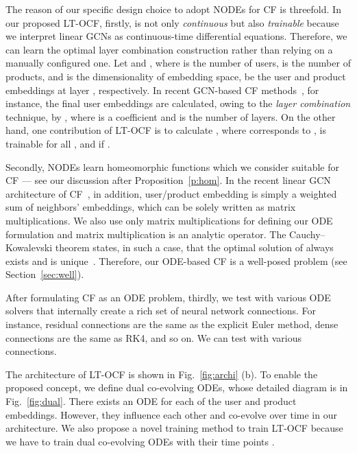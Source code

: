 \documentclass[sigconf]{acmart}
\begin{document}
The reason of our specific design choice to adopt NODEs for CF is threefold. In our proposed LT-OCF, firstly,  is not only \emph{continuous} but also \emph{trainable} because we interpret linear GCNs as continuous-time differential equations. Therefore, we can learn the optimal layer combination construction rather than relying on a manually configured one. Let  and , where  is the number of users,  is the number of products, and  is the dimensionality of embedding space, be the user and product embeddings at layer , respectively. In recent GCN-based CF methods~\cite{Chen_Wu_Hong_Zhang_Wang_2020,10.1145/3397271.3401063}, for instance, the final user embeddings are calculated, owing to the \emph{layer combination} technique, by , where  is a coefficient and  is the number of layers. On the other hand, one contribution of LT-OCF is to calculate , where  corresponds to ,  is trainable for all , and  if .

Secondly, NODEs learn homeomorphic functions which we consider suitable for CF --- see our discussion after Proposition~\ref{p:hom}. In the recent linear GCN architecture of CF~\cite{10.1145/3397271.3401063}, in addition, user/product embedding is simply a weighted sum of neighbors' embeddings, which can be solely written as matrix multiplications. We also use only matrix multiplications for defining our ODE formulation and matrix multiplication is an analytic operator. The Cauchy--Kowalevski theorem states, in such a case, that the optimal solution of  always exists and is unique~\cite{10.2307/j.ctvzsmfgn}. Therefore, our ODE-based CF is a well-posed problem (see Section~\ref{sec:well}).

After formulating CF as an ODE problem, thirdly, we test with various ODE solvers that internally create a rich set of neural network connections. For instance, residual connections are the same as the explicit Euler method, dense connections are the same as RK4, and so on. We can test with various connections.

The architecture of LT-OCF is shown in Fig.~\ref{fig:archi} (b). To enable the proposed concept, we define dual co-evolving ODEs, whose detailed diagram is in Fig.~\ref{fig:dual}. There exists an ODE for each of the user and product embeddings. However, they influence each other and co-evolve over time in our architecture. We also propose a novel training method to train LT-OCF because we have to train dual co-evolving ODEs with their time points .
\end{document}
